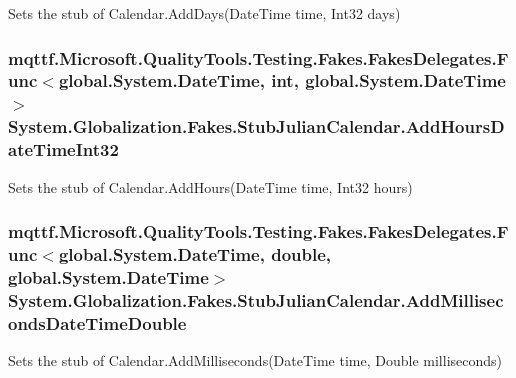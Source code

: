 Sets the stub of Calendar.\-Add\-Days(\-Date\-Time time, Int32 days)

\hypertarget{class_system_1_1_globalization_1_1_fakes_1_1_stub_julian_calendar_ad3c442f2107e8277c685086d7ea601c8}{
\subsubsection[{Add\-Hours\-Date\-Time\-Int32}]{\setlength{\rightskip}{0pt plus 5cm}mqttf.\-Microsoft.\-Quality\-Tools.\-Testing.\-Fakes.\-Fakes\-Delegates.\-Func$<$global.\-System.\-Date\-Time, int, global.\-System.\-Date\-Time$>$ System.\-Globalization.\-Fakes.\-Stub\-Julian\-Calendar.\-Add\-Hours\-Date\-Time\-Int32}}\label{class_system_1_1_globalization_1_1_fakes_1_1_stub_julian_calendar_ad3c442f2107e8277c685086d7ea601c8}


Sets the stub of Calendar.\-Add\-Hours(\-Date\-Time time, Int32 hours)

\hypertarget{class_system_1_1_globalization_1_1_fakes_1_1_stub_julian_calendar_a4966cc74cd2760008a01fde975590428}{
\subsubsection[{Add\-Milliseconds\-Date\-Time\-Double}]{\setlength{\rightskip}{0pt plus 5cm}mqttf.\-Microsoft.\-Quality\-Tools.\-Testing.\-Fakes.\-Fakes\-Delegates.\-Func$<$global.\-System.\-Date\-Time, double, global.\-System.\-Date\-Time$>$ System.\-Globalization.\-Fakes.\-Stub\-Julian\-Calendar.\-Add\-Milliseconds\-Date\-Time\-Double}}\label{class_system_1_1_globalization_1_1_fakes_1_1_stub_julian_calendar_a4966cc74cd2760008a01fde975590428}


Sets the stub of Calendar.\-Add\-Milliseconds(\-Date\-Time time, Double milliseconds)

